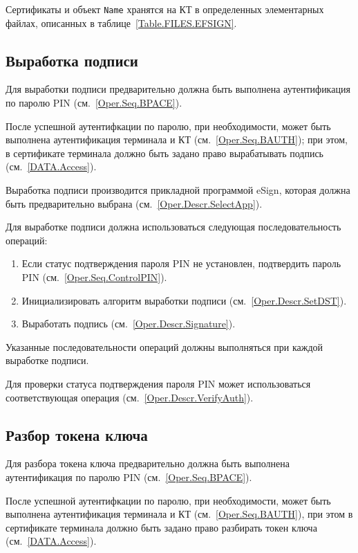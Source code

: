 Сертификаты и объект \texttt{Name} 
хранятся на КТ в определенных элементарных файлах, 
описанных в таблице~\ref{Table.FILES.EFSIGN}.

\subsection{Выработка подписи}
\label{Oper.Seq.Sig}

Для выработки подписи предварительно 
должна быть выполнена аутентификация по 
паролю PIN  (см.~\ref{Oper.Seq.BPACE}).

После успешной аутентифкации по паролю,
при необходимости, может быть выполнена 
аутентификация терминала и КТ (см.~\ref{Oper.Seq.BAUTH});
при этом, в сертификате терминала должно быть задано право
вырабатывать подпись (см.~\ref{DATA.Access}).

Выработка подписи производится прикладной программой eSign, которая
должна быть предварительно выбрана (см.~\ref{Oper.Descr.SelectApp}).

Для выработке подписи  должна использоваться 
следующая последовательность операций:
%
\begin{enumerate}
\item Если статус подтверждения пароля PIN не установлен,
      подтвердить пароль PIN (см.~\ref{Oper.Seq.ControlPIN}).
\item Инициализировать алгоритм выработки подписи (см.~\ref{Oper.Descr.SetDST}).
\item Выработать подпись (см.~\ref{Oper.Descr.Signature}).
\end{enumerate}
%
Указанные последовательности операций должны выполняться
при каждой выработке подписи.

Для проверки статуса подтверждения пароля PIN может использоваться 
соответствующая операция (см.~\ref{Oper.Descr.VerifyAuth}).

\subsection{Разбор токена ключа}
\label{Oper.Seq.Decipher}

Для разбора токена ключа предварительно 
должна быть выполнена аутентификация по 
паролю PIN  (см.~\ref{Oper.Seq.BPACE}).

После успешной аутентифкации по паролю,
при необходимости, может быть выполнена аутентификация 
терминала и КТ (см.~\ref{Oper.Seq.BAUTH}),
при этом в сертификате терминала должно быть задано право
разбирать токен ключа (см.~\ref{DATA.Access}).

